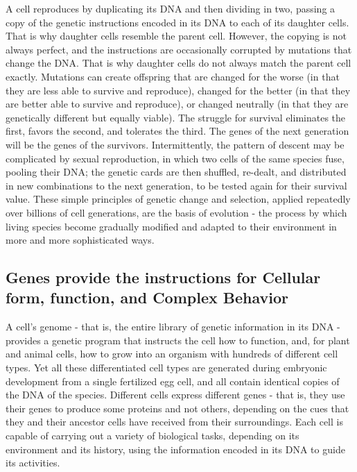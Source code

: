 A cell reproduces by duplicating its DNA and then dividing in two, passing
a copy of the genetic instructions encoded in its DNA to each of its daughter
cells. That is why daughter cells resemble the parent cell. However,
the copying is not always perfect, and the instructions are occasionally
corrupted by mutations that change the DNA. That is why daughter cells
do not always match the parent cell exactly.
Mutations can create offspring that are changed for the worse (in that
they are less able to survive and reproduce), changed for the better (in
that they are better able to survive and reproduce), or changed neutrally
(in that they are genetically different but equally viable). The struggle
for survival eliminates the first, favors the second, and tolerates the
third. The genes of the next generation will be the genes of the survivors.
Intermittently, the pattern of descent may be complicated by sexual
reproduction, in which two cells of the same species fuse, pooling their
DNA; the genetic cards are then shuffled, re-dealt, and distributed in new
combinations to the next generation, to be tested again for their survival
value.
These simple principles of genetic change and selection, applied repeatedly
over billions of cell generations, are the basis of evolution - the
process by which living species become gradually modified and adapted
to their environment in more and more sophisticated ways.

\subsection{Genes provide the instructions for Cellular form, function, and Complex Behavior}

A cell’s genome - that is, the entire library of genetic information in its
DNA - provides a genetic program that instructs the cell how to function,
and, for plant and animal cells, how to grow into an organism with
hundreds of different cell types.
Yet all these differentiated cell types are generated during
embryonic development from a single fertilized egg cell, and all contain
identical copies of the DNA of the species.
Different
cells express different genes - that is, they use their genes to produce
some proteins and not others, depending on the cues that they and their
ancestor cells have received from their surroundings.
Each cell is capable of carrying out a variety of biological
tasks, depending on its environment and its history, using the information
encoded in its DNA to guide its activities.

